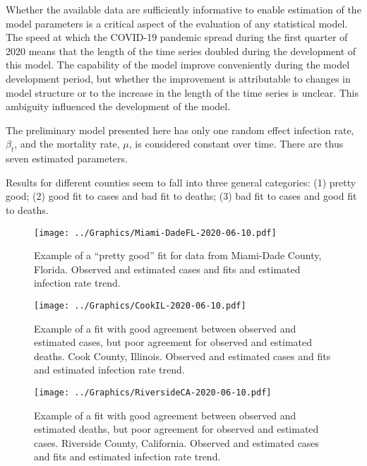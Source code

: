 \documentclass[12pt,letterpaper]{article}
\begin{document}
Whether the available data are sufficiently informative to enable
estimation of the model parameters is a critical aspect of the
evaluation of any statistical model.
The speed at which the COVID-19 pandemic spread during the first
quarter of
2020 means that the length of the time series doubled during
the development of this model. The capability of the
model improve conveniently during the model development period,
but whether the improvement is
attributable to changes in model structure or to the increase in the
length of the time series is unclear. This ambiguity influenced the
development of the model.

The preliminary model presented here has only one random effect
infection rate, $\beta_t$, and the mortality rate, $\mu$, is
considered constant over time. There are thus seven estimated
parameters.      

Results for different counties seem to fall into three general
categories: (1) pretty good; 
(2) good fit to cases and bad fit to deaths; 
(3) bad fit to cases and good fit to deaths. 

\clearpage
\printbibliography[title=References]

\clearpage

\begin{figure}
\begin{center}
\caption{\label{fig:pgf}
Example of a ``pretty good'' fit for data from
Miami-Dade County, Florida.
Observed and estimated cases and fits and estimated infection rate
trend.}
\texttt{[image: ../Graphics/Miami-DadeFL-2020-06-10.pdf]}
\end{center}
\end{figure}

\begin{figure}
\begin{center}
\caption{\label{fig:gcbd}
Example of a fit with good agreement between observed and estimated
cases, but poor agreement for observed and estimated deaths.
Cook County, Illinois.
Observed and estimated cases and fits and estimated infection rate
trend.}
\texttt{[image: ../Graphics/CookIL-2020-06-10.pdf]}
\end{center}
\end{figure}

\begin{figure}
\begin{center}
\caption{\label{fig:bcgd}
Example of a fit with good agreement between observed and estimated
deaths, but poor agreement for observed and estimated cases.
Riverside County, California.
Observed and estimated cases and fits and estimated infection rate
trend.}
\texttt{[image: ../Graphics/RiversideCA-2020-06-10.pdf]}
\end{center}
\end{figure}
\end{document}
